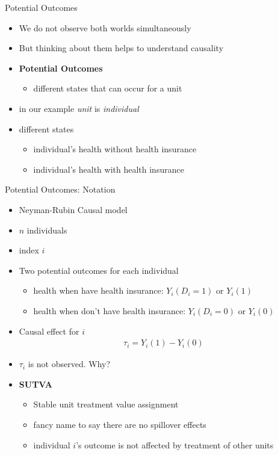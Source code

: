 \documentclass{beamer}
\begin{document}
	
	
	
	\begin{frame}{Potential Outcomes}
		\begin{itemize}
			\item We do not observe both worlds simultaneously
			\item But thinking about them helps to understand causality
			\item \textbf{Potential Outcomes}
			\begin{itemize}
				\item different states that can occur for a unit 
			\end{itemize}
			\item in our example \textit{unit} is \textit{individual}
			\item different states
			\begin{itemize}
				\item individual's health without health insurance
				\item individual's health with health insurance
			\end{itemize}
		\end{itemize}
	\end{frame}
	
	\begin{frame}{Potential Outcomes: Notation}
		\begin{itemize}
			\item Neyman-Rubin Causal model
			\item $n$ individuals 
			\item index $i$
			\item Two potential outcomes for each individual
			\begin{itemize}
				\item health when have health insurance: $Y_i(D_i=1)$ or $Y_i(1)$
				\item health when don't have health insurance: $Y_i(D_i=0)$ or $Y_i(0)$
			\end{itemize}
			\item Causal effect for $i$
				\begin{align*}
					\tau_i = Y_i(1) - Y_i(0)
				\end{align*}
			\item $\tau_i$ is not observed. Why?	
			\item \textbf{SUTVA} 
			\begin{itemize}
				\item Stable unit treatment value assignment
				\item fancy name to say there are no spillover effects
				\item individual $i$'s outcome is not affected by treatment of other units
			\end{itemize}
		\end{itemize}
	\end{frame}
	
\end{document}
